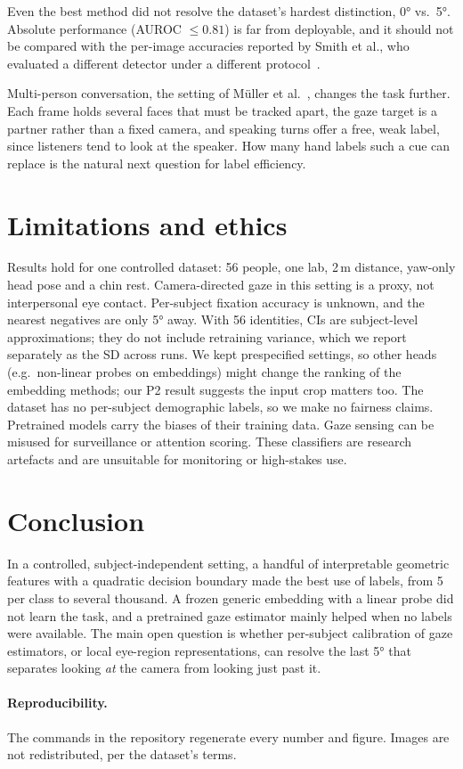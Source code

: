 \documentclass[10pt,twocolumn]{article}
\begin{document}
Even the best method did not resolve the dataset's hardest distinction, 0° vs.\ 5°. Absolute performance
(AUROC $\le0.81$) is far from deployable, and it should not be compared with the per-image accuracies reported by
Smith et al., who evaluated a different detector under a different protocol~\cite{smith2013gazelocking}.

Multi-person conversation, the setting of M\"uller et al.~\cite{muller2018robust}, changes the task further.
Each frame holds several faces that must be tracked apart, the gaze target is a partner rather than a fixed camera,
and speaking turns offer a free, weak label, since listeners tend to look at the speaker. How many hand labels
such a cue can replace is the natural next question for label efficiency.

\section{Limitations and ethics}
Results hold for one controlled dataset: 56 people, one lab, 2\,m distance, yaw-only head pose and a chin rest.
Camera-directed gaze in this setting is a proxy, not interpersonal eye contact.
Per-subject fixation accuracy is unknown, and the nearest negatives are only 5° away.
With 56 identities, CIs are subject-level approximations; they do not include retraining variance,
which we report separately as the SD across runs.
We kept prespecified settings, so other heads (e.g.\ non-linear probes on embeddings) might change
the ranking of the embedding methods; our P2 result suggests the input crop matters too.
The dataset has no per-subject demographic labels, so we make no fairness claims. Pretrained models carry the
biases of their training data. Gaze sensing can be misused for surveillance or attention scoring.
These classifiers are research artefacts and are unsuitable for monitoring or high-stakes use.

\section{Conclusion}
In a controlled, subject-independent setting, a handful of interpretable geometric features with a quadratic
decision boundary made the best use of labels, from 5 per class to several thousand. A frozen generic
embedding with a linear probe did not learn the task, and a pretrained gaze estimator mainly helped when no labels
were available. The main open question is whether per-subject calibration of gaze estimators, or local
eye-region representations, can resolve the last 5° that separates looking \emph{at} the camera from looking
just past it.

\paragraph{Reproducibility.}
The commands in the repository regenerate every number and figure. Images are not redistributed,
per the dataset's terms.

{\small


}
\end{document}
